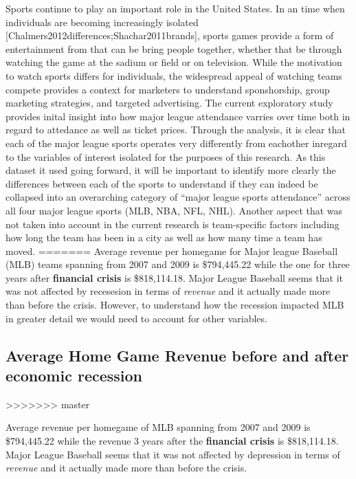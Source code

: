 \documentclass[man, fleqn, noextraspace,floatsintext]{apa6}
\begin{document}
Sports continue to play an important role in the United States. In an
time when individuals are becoming increasingly isolated
{[}Chalmers2012differences;Shachar2011brands{]}, sports games provide a
form of entertainment from that can be bring people together, whether
that be through watching the game at the sadium or field or on
television. While the motivation to watch sports differs for
individuals, the widespread appeal of watching teams compete provides a
context for marketers to understand sponshorship, group marketing
strategies, and targeted advertising. The current exploratory study
provides inital insight into how major league attendance varries over
time both in regard to attedance as well as ticket prices. Through the
analysis, it is clear that each of the major league sports operates very
differently from eachother inregard to the variables of interest
isolated for the purposes of this research. As this dataset it used
going forward, it will be important to identify more clearly the
differences between each of the sports to understand if they can indeed
be collapsed into an overarching category of \enquote{major league
sports attendance} across all four major league sports (MLB, NBA, NFL,
NHL). Another aspect that was not taken into account in the current
research is team-specific factors including how long the team has been
in a city as well as how many time a team has moved.
=======
Average revenue per homegame for Major league Baseball (MLB) teams spanning from 2007 and 2009 is \$794,445.22 while the one for three years after \textbf{financial crisis} is \$818,114.18. Major League Baseball seems that it was not affected by recesesion in terms of \emph{revenue} and it actually made more than before the crisis. However, to understand how the recession impacted MLB in greater detail we would need to account for other variables.

\hypertarget{average-home-game-revenue-before-and-after-economic-recession}{%
\subsection{Average Home Game Revenue before and after economic recession}\label{average-home-game-revenue-before-and-after-economic-recession}}
>>>>>>> master

Average revenue per homegame of MLB spanning from 2007 and 2009 is \$794,445.22 while the revenue 3 years after the \textbf{financial crisis} is \$818,114.18. Major League Baseball seems that it was not affected by depression in terms of \emph{revenue} and it actually made more than before the crisis.
\end{document}
